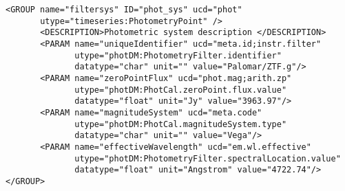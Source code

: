 \noindent
\begingroup\footnotesize
\begin{tcolorbox}
\begin{verbatim}
<GROUP name="filtersys" ID="phot_sys" ucd="phot" 
       utype="timeseries:PhotometryPoint" /> 
       <DESCRIPTION>Photometric system description </DESCRIPTION>
       <PARAM name="uniqueIdentifier" ucd="meta.id;instr.filter" 
              utype="photDM:PhotometryFilter.identifier" 
              datatype="char" unit="" value="Palomar/ZTF.g"/>
       <PARAM name="zeroPointFlux" ucd="phot.mag;arith.zp" 
              utype="photDM:PhotCal.zeroPoint.flux.value" 
              datatype="float" unit="Jy" value="3963.97"/>
       <PARAM name="magnitudeSystem" ucd="meta.code" 
              utype="photDM:PhotCal.magnitudeSystem.type" 
              datatype="char" unit="" value="Vega"/>
       <PARAM name="effectiveWavelength" ucd="em.wl.effective" 
              utype="photDM:PhotometryFilter.spectralLocation.value" 
              datatype="float" unit="Angstrom" value="4722.74"/>
</GROUP>
\end{verbatim}
\end{tcolorbox}
\endgroup
